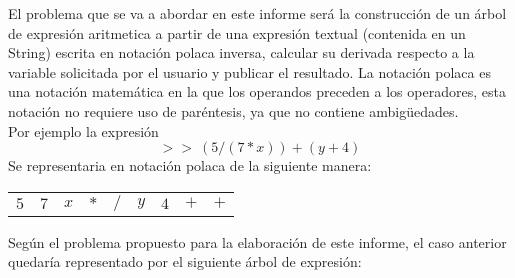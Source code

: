 \documentclass[letterpaper,11pt]{article} %
\begin{document}









El problema que se va a abordar en este informe será la construcción de un árbol de expresión aritmetica a partir de una expresión textual (contenida en un String)	escrita	en notación	polaca	inversa, calcular su derivada respecto a la variable solicitada por el usuario y publicar el resultado.
\newp
La notación polaca es una notación matemática en la que los operandos preceden a los operadores, esta notación no requiere uso de paréntesis, ya que no contiene ambigüedades.\\
Por ejemplo la expresión $$> >\ (5 / (7*x)) + (y+4)$$
Se representaria en notación polaca de la siguiente manera:

\begin{table}
\begin{tabular}{|c|c|c|c|c|c|c|c|c|}
\cline{1-9}
$5$ & $7$ & $x$ & $*$ & $/$ & $y$ & $4$ & $+$ & $+$\\
\cline{1-9}
\end{tabular}
\end{table}
\newp
Según el problema propuesto para la elaboración de este informe, el caso anterior quedaría representado por el siguiente árbol de expresión:\\

\begin{figure}[!h]
\centering
{}
\end{figure}
\end{document}
